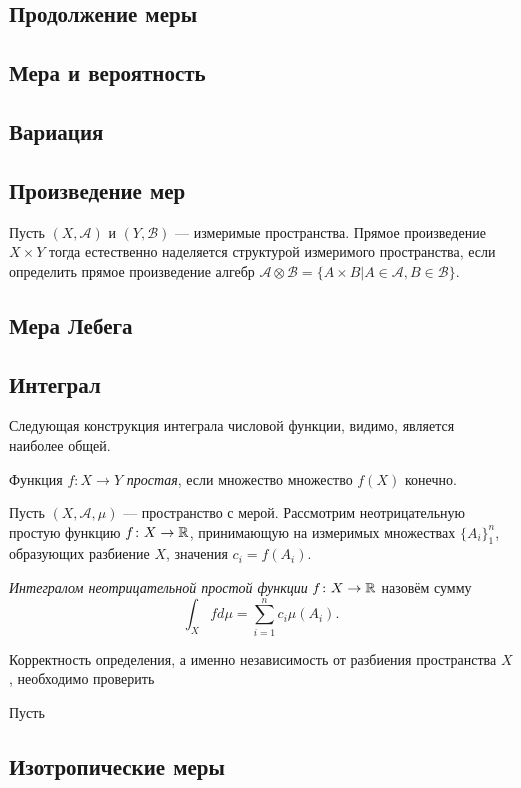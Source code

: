 \subsection{Продолжение меры}

\subsection{Мера и вероятность}

\subsection{Вариация}

\subsection{Произведение мер}
Пусть $(X,\mathcal{A})$ и $(Y,\mathcal{B})$ --- измеримые пространства. Прямое произведение $X\times Y$ тогда естественно наделяется структурой измеримого пространства, если определить прямое произведение алгебр $\mathcal{A}\otimes\mathcal{B}=\{A\times B|A\in\mathcal{A},B\in\mathcal{B}\}$.

\subsection{Мера Лебега}

\subsection{Интеграл}
Следующая конструкция интеграла числовой функции, видимо, является наиболее общей.
\begin{defin}
	Функция $f\colon X\to Y$ \textit{простая}, если множество множество $f(X)$ конечно.
\end{defin}
Пусть $(X,\mathcal{A},\mu)$ --- пространство с мерой. Рассмотрим неотрицательную простую функцию $f\colon X\to\mathbb {R}$, принимающую на измеримых множествах $\{A_i\}_1^n$, образующих разбиение $X$, значения $c_i=f(A_i)$.
\begin{defin}
	\textit{Интегралом неотрицательной простой функции} $f\colon X\to\mathbb {R}$ назовём сумму
	\begin{equation}
		\int_X fd\mu=\sum_{i=1}^n c_i\mu(A_i).
	\end{equation}
\end{defin}
Корректность определения, а именно независимость от разбиения пространства $X$, необходимо проверить
\begin{prop}
	
\end{prop}
\begin{defin}
	Пусть
\end{defin}

\subsection{Изотропические меры}